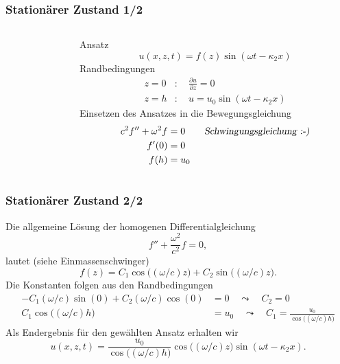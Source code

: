 \documentclass[hyperref={pdfpagemode=FullScreen, colorlinks=false}]{beamer}
\begin{document}
\begin{frame}
\frametitle{Stationärer Zustand 1/2}
\begin{columns}
\begin{column}[t]{.1\linewidth}

\end{column}
\begin{column}[b]{.9\linewidth}
Ansatz
\begin{equation*}
u(x,z,t) = f(z) \sin(\omega t - \kappa_2 x) 
\end{equation*}
Randbedingungen
\begin{align*}
z=0 &:\quad \frac{\partial u}{\partial z}=0\\
z=h &:\quad u=u_0 \sin(\omega t - \kappa_2 x)
\end{align*}
Einsetzen des Ansatzes in die Bewegungsgleichung
\begin{align*}
 c^2 f''+\omega^2 f &=0 \qquad \text{\textsl{Schwingungsgleichung :-)}}\\
 f'(0) &=0\\
 f(h) &= u_0
\end{align*}
\end{column}
\end{columns}
\end{frame}

\begin{frame}
\frametitle{Stationärer Zustand 2/2}
Die allgemeine Lösung der homogenen Differentialgleichung
\begin{equation*}
 f''+\frac{\omega^2}{c^2}f=0,
\end{equation*}
lautet (siehe Einmassenschwinger)
\begin{equation*}
 f(z)=C_1\cos\bigl((\omega/c)z\bigr)+C_2\sin\bigl((\omega/c)z\bigr).
\end{equation*}
Die Konstanten folgen aus den Randbedingungen
\begin{align*}
-C_1(\omega/c)\sin(0)+C_2(\omega/c)\cos(0)&=0 \quad \leadsto \quad C_2=0\\
 C_1\cos\bigl((\omega/c)h\bigr)&=u_0
 \quad \leadsto \quad C_1=\frac{u_0}{\cos\bigl((\omega/c)h\bigr)}
\end{align*}
Als Endergebnis für den gewählten Ansatz erhalten wir
\begin{equation*}
 u(x,z,t)=\frac{u_0}{\cos\bigl((\omega/c)h\bigr)}\cos\bigl((\omega/c)z\bigr)\sin(\omega t - \kappa_2 x) .
\end{equation*}
\end{frame}
\end{document}
